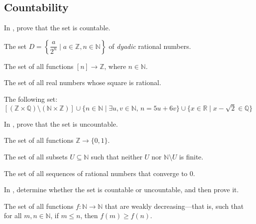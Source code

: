 \subsection*{Countability}


In , prove that the set is countable.

\begin{chapex}
\label{cqProveCountableBegin}
The set $D = \left\{ \dfrac{a}{2^n} \mid a \in \mathbb{Z}, n \in \mathbb{N} \right\}$ of \textit{dyadic} rational numbers.
\end{chapex}

\begin{chapex}
The set of all functions $[n] \to \mathbb{Z}$, where $n \in \mathbb{N}$.
\end{chapex}

\begin{chapex}
The set of all real numbers whose square is rational.
\end{chapex}

\begin{chapex}
\label{cqProveCountableEnd}
The following set:
\[
[(\mathbb{Z} \times \mathbb{Q}) \setminus (\mathbb{N} \times \mathbb{Z})] \cup \{ n \in \mathbb{N} \mid \exists u,v \in \mathbb{N},\, n=5u+6v \} \cup \{ x \in \mathbb{R} \mid x-\sqrt{2} \in \mathbb{Q} \}
\]
\end{chapex}

In , prove that the set is uncountable.

\begin{chapex}
\label{cqProveUncountableBegin}
The set of all functions $\mathbb{Z} \to \{ 0,1 \}$.
\end{chapex}

\begin{chapex}
The set of all subsets $U \subseteq \mathbb{N}$ such that neither $U$ nor $\mathbb{N} \setminus U$ is finite.
\end{chapex}

\begin{chapex}
\label{cqProveUncountableEnd}
The set of all sequences of rational numbers that converge to $0$.
\end{chapex}

In , determine whether the set is countable or uncountable, and then prove it.

\begin{chapex}
\label{cqDetermineIfCountableBegin}
The set of all functions $f : \mathbb{N} \to \mathbb{N}$ that are weakly decreasing---that is, such that for all $m,n \in \mathbb{N}$, if $m \le n$, then $f(m) \ge f(n)$.
\end{chapex}

